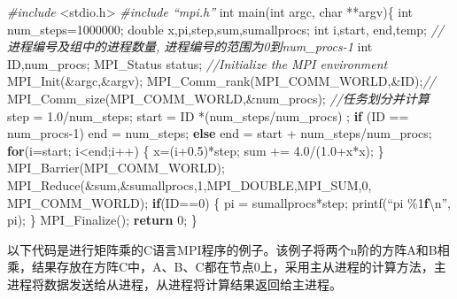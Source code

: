 \documentclass[]{ctexbook}
\newenvironment{Shaded}{\begin{snugshade}}{\end{snugshade}}
\newcommand{\CommentTok}[1]{\textcolor[rgb]{0.56,0.35,0.01}{\textit{#1}}}
\newcommand{\ControlFlowTok}[1]{\textcolor[rgb]{0.13,0.29,0.53}{\textbf{#1}}}
\newcommand{\DataTypeTok}[1]{\textcolor[rgb]{0.13,0.29,0.53}{#1}}
\newcommand{\DecValTok}[1]{\textcolor[rgb]{0.00,0.00,0.81}{#1}}
\newcommand{\ErrorTok}[1]{\textcolor[rgb]{0.64,0.00,0.00}{\textbf{#1}}}
\newcommand{\FloatTok}[1]{\textcolor[rgb]{0.00,0.00,0.81}{#1}}
\newcommand{\ImportTok}[1]{#1}
\newcommand{\NormalTok}[1]{#1}
\newcommand{\PreprocessorTok}[1]{\textcolor[rgb]{0.56,0.35,0.01}{\textit{#1}}}
\begin{document}
\begin{Shaded}
\begin{Highlighting}[]
\PreprocessorTok{\#include }\ImportTok{\textless{}stdio.h\textgreater{}}
\PreprocessorTok{\#include “mpi.h”}
\DataTypeTok{int}\NormalTok{ main(}\DataTypeTok{int}\NormalTok{ argc, }\DataTypeTok{char}\NormalTok{ **argv)\{}
    \DataTypeTok{int}\NormalTok{ num\_steps=}\DecValTok{1000000}\NormalTok{;}
    \DataTypeTok{double}\NormalTok{ x,pi,step,sum,sumallprocs;}
    \DataTypeTok{int}\NormalTok{  i,start, end,temp;}
    \CommentTok{//进程编号及组中的进程数量, 进程编号的范围为0到num\_procs{-}1}
    \DataTypeTok{int}\NormalTok{ ID,num\_procs;}
\NormalTok{    MPI\_Status status;}
    \CommentTok{//Initialize the MPI environment}
\NormalTok{    MPI\_Init(\&argc,\&argv);}
\NormalTok{    MPI\_Comm\_rank(MPI\_COMM\_WORLD,\&ID);}\CommentTok{//}
\NormalTok{    MPI\_Comm\_size(MPI\_COMM\_WORLD,\&num\_procs);}
    \CommentTok{//任务划分并计算}
\NormalTok{    step = }\FloatTok{1.0}\NormalTok{/num\_steps;}
\NormalTok{    start = ID *(num\_steps/num\_procs) ;}
    \ControlFlowTok{if}\NormalTok{ (ID == num\_procs{-}}\DecValTok{1}\NormalTok{)}
\NormalTok{        end = num\_steps;}
    \ControlFlowTok{else}
\NormalTok{        end = start + num\_steps/num\_procs;}
    \ControlFlowTok{for}\NormalTok{(i=start; i\textless{}end;i++) \{}
\NormalTok{        x=(i+}\FloatTok{0.5}\NormalTok{)*step;}
\NormalTok{        sum += }\FloatTok{4.0}\NormalTok{/(}\FloatTok{1.0}\NormalTok{+x*x);}
\NormalTok{    \}}
\NormalTok{    MPI\_Barrier(MPI\_COMM\_WORLD);}
\NormalTok{    MPI\_Reduce(\&sum,\&sumallprocs,}\DecValTok{1}\NormalTok{,MPI\_DOUBLE,MPI\_SUM,}\DecValTok{0}\NormalTok{, MPI\_COMM\_WORLD);}
    \ControlFlowTok{if}\NormalTok{(ID==}\DecValTok{0}\NormalTok{) \{}
\NormalTok{        pi = sumallprocs*step;}
\NormalTok{        printf(“pi \%}\DecValTok{1}\ErrorTok{f}\NormalTok{\textbackslash{}n”, pi);}
\NormalTok{    \}}
\NormalTok{    MPI\_Finalize();}
    \ControlFlowTok{return} \DecValTok{0}\NormalTok{;}
\NormalTok{\}}
\end{Highlighting}
\end{Shaded}

以下代码是进行矩阵乘的C语言MPI程序的例子。该例子将两个n阶的方阵A和B相乘，结果存放在方阵C中，A、B、C都在节点0上，采用主从进程的计算方法，主进程将数据发送给从进程，从进程将计算结果返回给主进程。
\end{document}
